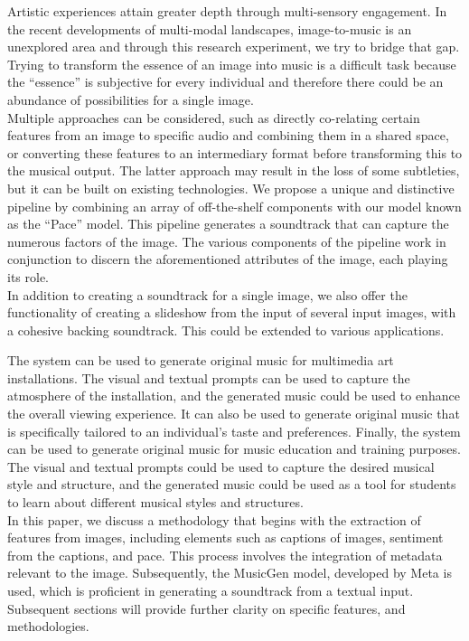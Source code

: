 \documentclass[conference]{IEEEtran}
\begin{document}
{
Artistic experiences attain greater depth through multi-sensory engagement. In the recent developments of multi-modal landscapes, image-to-music is an unexplored area and through this research experiment, we try to bridge that gap.
\\

Trying to transform the essence of an image into music is a difficult task because the ``essence'' is subjective for every individual and therefore there could be an abundance of possibilities for a single image.
\\

Multiple approaches can be considered, such as directly co-relating certain features from an image to specific audio and combining them in a shared space, or converting these features to an intermediary format before transforming this to the musical output. The latter approach may result in the loss of some subtleties, but it can be built on existing technologies.
We propose a unique and distinctive pipeline by combining an array of off-the-shelf components with our model known as the ``Pace'' model. This pipeline generates a soundtrack that can capture the numerous factors of the image. The various components of the pipeline work in conjunction to discern the aforementioned attributes of the image, each playing its role.
\\

In addition to creating a soundtrack for a single image, we also offer the functionality of creating a slideshow from the input of several input images, with a cohesive backing soundtrack. This could be extended to various applications.

The system can be used to generate original music for multimedia art installations. The visual and textual prompts can be used to capture the atmosphere of the installation, and the generated music could be used to enhance the overall viewing experience. It can also be used to generate original music that is specifically tailored to an individual's taste and preferences. Finally, the system can be used to generate original music for music education and training purposes. The visual and textual prompts could be used to capture the desired musical style and structure, and the generated music could be used as a tool for students to learn about different musical styles and structures.
\\

In this paper, we discuss a methodology that begins with the extraction of features from images, including elements such as captions of images, sentiment from the captions, and pace. This process involves the integration of metadata relevant to the image. Subsequently, the MusicGen model, developed by Meta is used, which is proficient in generating a soundtrack from a textual input. Subsequent sections will provide further clarity on specific features, and methodologies.
}
\end{document}

